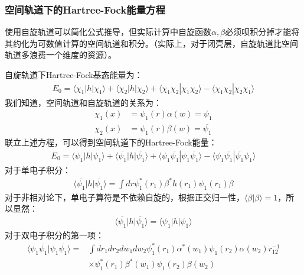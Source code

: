 \documentclass[12pt, a4paper, oneside]{ctexart}
\begin{document}
\subsubsection{空间轨道下的Hartree-Fock能量方程}
使用自旋轨道可以简化公式推导，但实际计算中自旋函数$\alpha,\beta$必须呗积分掉才能将其约化为可数值计算的空间轨道和积分。（实际上，对于闭壳层，自旋轨道比空间轨道多浪费一个维度的资源）。\par
自旋轨道下Hartree-Fock基态能量为：
\begin{equation}
\begin{aligned}
E_0=\langle \chi_1|h|\chi_1\rangle+\langle \chi_2|h|\chi_2\rangle+\langle \chi_1\chi_2|\chi_1\chi_2\rangle-\langle \chi_1\chi_2|\chi_2\chi_1\rangle
\end{aligned}
\end{equation}
我们知道，空间轨道和自旋轨道的关系为：
\begin{equation}
\begin{aligned}
\chi_1(x)&=\psi_1(r)\alpha(w)=\psi_1 \\
\chi_2(x)&=\psi_1(r)\beta(w)=\overline{\psi_1}
\end{aligned}
\end{equation}
联立上述方程，可以得到空间轨道下的Hartree-Fock能量：
\begin{equation}
\begin{aligned}
E_0=\langle \psi_1|h|\psi_1\rangle+\langle \overline{\psi_1}|h|\overline{\psi_1}\rangle+\langle \psi_1\overline{\psi_1}|\psi_1\overline{\psi_1}\rangle-\langle \psi_1\overline{\psi_1}|\overline{\psi_1}\psi_1\rangle
\end{aligned}
\end{equation}
对于单电子积分：
\begin{equation}
\begin{aligned}
\langle \overline{\psi_1}|h|\overline{\psi_1}\rangle=\int dr\psi_1^*(r_1)\beta^*h(r_1)\psi_1(r_1)\beta
\end{aligned}
\end{equation}
对于非相对论下，单电子算符是不依赖自旋的，根据正交归一性，$\langle \beta|\beta\rangle=1$，所以显然：
\begin{equation}
\begin{aligned}
\langle \overline{\psi_1}|h|\overline{\psi_1}\rangle=\langle \psi_1|h|\psi_1\rangle
\end{aligned}
\end{equation}
对于双电子积分的第一项：
\begin{equation}
\begin{aligned}
\langle \psi_1\overline{\psi_1}|\psi_1\overline{\psi_1}\rangle=&\int dr_1dr_2dw_1dw_2\psi_1^*(r_1)\alpha^*(w_1)\psi_1(r_2)\alpha(w_2) r_{12}^{-1}\\
&\times\psi_1^*(r_1)\beta^*(w_1)\psi_1(r_2)\beta(w_2)
\end{aligned}
\end{equation}
\end{document}
